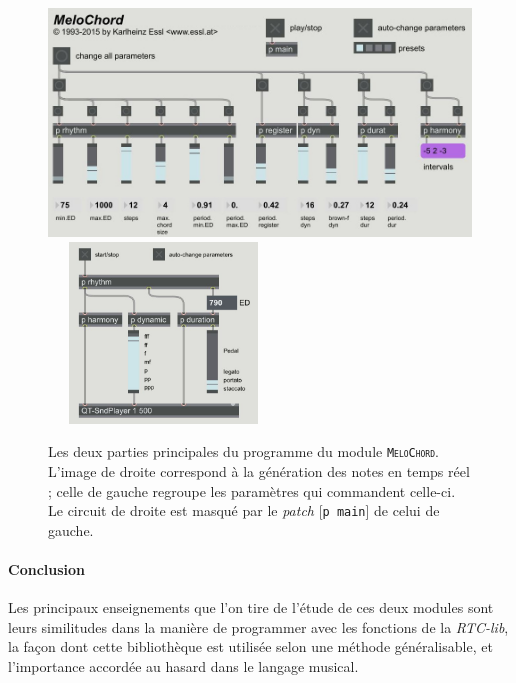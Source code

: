 \documentclass[a4paper,12pt]{article}
\newcommand{\module}[1]{\texttt{\textsc{#1}}}
\newcommand{\patch}[1]{[\texttt{#1}]}
\begin{document}
\begin{figure}[h!]
\begin{center}
\includegraphics[width=12cm]{images/melochord1.jpg}~~~\includegraphics[width=5cm]{images/melochord2.jpg}
\label{melochordmain}
\caption{\footnotesize Les deux parties principales du programme du module \module{MeloChord}. L'image de droite correspond à la génération des notes en temps réel ; celle de gauche regroupe les paramètres qui commandent celle-ci. Le circuit de droite est masqué par le \emph{patch} \patch{p main} de celui de gauche.}
\end{center}
\end{figure}


\paragraph{Conclusion \\}

Les principaux enseignements que l'on tire de l'étude de ces deux modules sont leurs similitudes dans la manière de programmer avec les fonctions de la \emph{RTC-lib}, la façon dont cette bibliothèque est utilisée selon une méthode généralisable, et l'importance accordée au hasard dans le langage musical.
\end{document}
